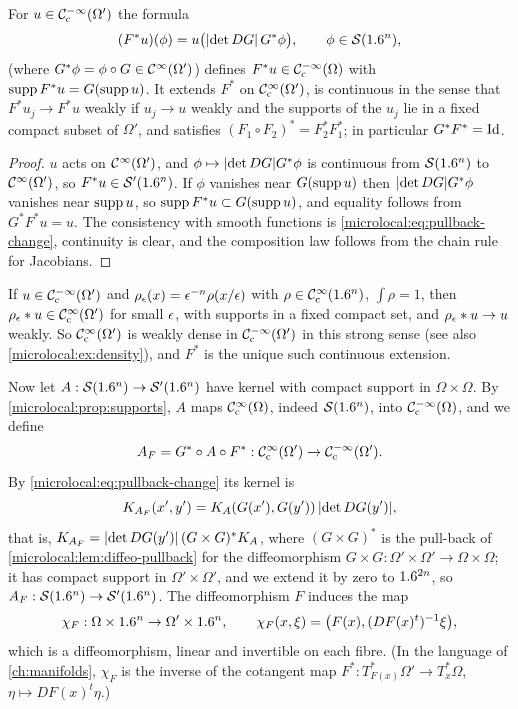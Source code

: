 \begin{lemma}\label{microlocal:lem:diffeo-pullback}
  For $u\in\mathcal{C}^{-\infty}_{\mathrm{c}}(\Omega')$ the formula
  \begin{equation*}
    (F^*u)(\phi)=u\bigl(\lvert \det DG\rvert\,G^*\phi\bigr),\qquad\phi\in\mathcal{S}(1.6^n),
  \end{equation*}
  (where $G^*\phi=\phi\circ G\in\mathcal{C}^\infty(\Omega')$) defines $F^*u\in\mathcal{C}^{-\infty}_{\mathrm{c}}(\Omega)$
  with $\operatorname{supp} F^*u=G(\operatorname{supp} u)$. It extends $F^*$ on $\mathcal{C}^\infty_{\mathrm{c}}(\Omega')$, is
  continuous in the sense that $F^*u_j\to F^*u$ weakly if $u_j\to u$ weakly
  and the supports of the $u_j$ lie in a fixed compact subset of $\Omega'$,
  and satisfies $(F_1\circ F_2)^*=F_2^*F_1^*$; in particular
  $G^*F^*=\operatorname{Id}$.
\end{lemma}
\begin{proof}
  $u$ acts on $\mathcal{C}^\infty(\Omega')$, and $\phi\mapsto\lvert \det DG\rvert G^*\phi$ is
  continuous from $\mathcal{S}(1.6^n)$ to $\mathcal{C}^\infty(\Omega')$, so $F^*u\in\mathcal{S}'(1.6^n)$. If
  $\phi$ vanishes near $G(\operatorname{supp} u)$ then $\lvert \det DG\rvert G^*\phi$ vanishes near
  $\operatorname{supp} u$, so $\operatorname{supp} F^*u\subset G(\operatorname{supp} u)$, and equality follows from
  $G^*F^*u=u$. The consistency with smooth functions is
  \eqref{microlocal:eq:pullback-change}, continuity is clear, and the
  composition law follows from the chain rule for Jacobians.
\end{proof}

If $u\in\mathcal{C}^{-\infty}_{\mathrm{c}}(\Omega')$ and $\rho_\epsilon(x)=\epsilon^{-n}\rho(x/\epsilon)$ with
$\rho\in\mathcal{C}^\infty_{\mathrm{c}}(1.6^n)$, $\int\rho=1$, then $\rho_\epsilon*u\in\mathcal{C}^\infty_{\mathrm{c}}(\Omega')$ for small
$\epsilon$, with supports in a fixed compact set, and $\rho_\epsilon*u\to u$ weakly.
So $\mathcal{C}^\infty_{\mathrm{c}}(\Omega')$ is weakly dense in $\mathcal{C}^{-\infty}_{\mathrm{c}}(\Omega')$ in this strong sense
(see also \cref{microlocal:ex:density}), and $F^*$ is the unique such
continuous extension.

Now let $A:\mathcal{S}(1.6^n)\to\mathcal{S}'(1.6^n)$ have kernel with compact support in
$\Omega\times\Omega$. By \cref{microlocal:prop:supports}, $A$ maps
$\mathcal{C}^\infty_{\mathrm{c}}(\Omega)$, indeed $\mathcal{S}(1.6^n)$, into $\mathcal{C}^{-\infty}_{\mathrm{c}}(\Omega)$, and we define
\begin{equation}\label{microlocal:eq:AF}
  A_F=G^*\circ A\circ F^*:\mathcal{C}^\infty_{\mathrm{c}}(\Omega')\to\mathcal{C}^{-\infty}_{\mathrm{c}}(\Omega').
\end{equation}
By \eqref{microlocal:eq:pullback-change} its kernel is
\begin{equation*}
  K_{A_F}(x',y')=K_A(G(x'),G(y'))\,\lvert \det DG(y')\rvert,
\end{equation*}
that is, $K_{A_F}=\lvert \det DG(y')\rvert\,(G\times G)^*K_A$, where $(G\times G)^*$
is the pull-back of \cref{microlocal:lem:diffeo-pullback} for the
diffeomorphism $G\times G:\Omega'\times\Omega'\to\Omega\times\Omega$; it has compact support in $\Omega'\times\Omega'$, and we extend it
by zero to $1.6^{2n}$, so $A_F:\mathcal{S}(1.6^n)\to\mathcal{S}'(1.6^n)$. The diffeomorphism
$F$ induces the map
\begin{equation*}
  \chi_F:\Omega\times1.6^n\to\Omega'\times1.6^n,\qquad
  \chi_F(x,\xi)=\bigl(F(x),(DF(x)^t)^{-1}\xi\bigr),
\end{equation*}
which is a diffeomorphism, linear and invertible on each fibre. (In the
language of \cref{ch:manifolds}, $\chi_F$ is the inverse of the cotangent map
$F^*:T^*_{F(x)}\Omega'\to T^*_x\Omega$, $\eta\mapsto DF(x)^t\eta$.)

